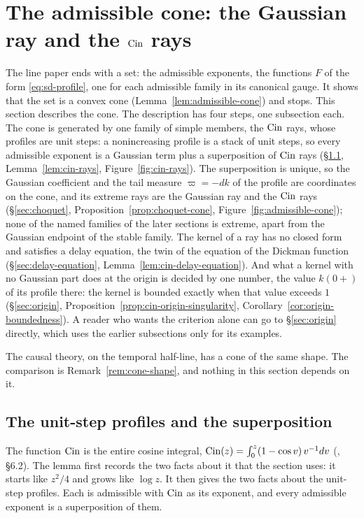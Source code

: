 \section{The admissible cone: the Gaussian ray and the \texorpdfstring{$\operatorname{Cin}$}{Cin} rays}
\label{sec:cone}

The line paper ends with a set: the admissible exponents, the functions $F$ of the form
\ref{eq:sd-profile}, one for each admissible family in its canonical gauge. It shows that
the set is a convex cone (Lemma~\ref{lem:admissible-cone}) and stops. This section describes
the cone. The description has four steps, one subsection each. The cone is generated by one family of
simple members, the $\operatorname{Cin}$ rays, whose profiles are unit steps: a nonincreasing profile is a
stack of unit steps, so every admissible exponent is a Gaussian term plus a superposition of
$\operatorname{Cin}$ rays (\S\ref{sec:cin-rays}, Lemma~\ref{lem:cin-rays}, Figure~\ref{fig:cin-rays}). The
superposition is unique, so the Gaussian coefficient and the tail measure $\varpi = -dk$ of
the profile are coordinates on the cone, and its extreme rays are the Gaussian ray and the
$\operatorname{Cin}$ rays (\S\ref{sec:choquet}, Proposition~\ref{prop:choquet-cone},
Figure~\ref{fig:admissible-cone}); none of the named families of the later sections is
extreme, apart from the Gaussian endpoint of the stable family. The kernel of a ray has no
closed form and satisfies a delay equation, the twin of the equation of the Dickman function
(\S\ref{sec:delay-equation}, Lemma~\ref{lem:cin-delay-equation}). And what a kernel with
no Gaussian part does at the origin is decided by one number, the value $k(0{+})$ of its
profile there: the kernel is bounded exactly when that value exceeds $1$
(\S\ref{sec:origin}, Proposition~\ref{prop:cin-origin-singularity},
Corollary~\ref{cor:origin-boundedness}). A reader who wants the criterion alone can go to
\S\ref{sec:origin} directly, which uses the earlier subsections only for its examples.

The causal theory, on the temporal half-line, has a cone of the same shape. The comparison is
Remark~\ref{rem:cone-shape}, and nothing in this section depends on it.

\subsection{The unit-step profiles and the superposition}\label{sec:cin-rays}

The function $\operatorname{Cin}$ is the entire cosine integral,
$\operatorname{Cin}(z) = \int_0^z (1 - \cos v)\,v^{-1}dv$ (, \S6.2). The lemma first
records the two facts about it that the section uses: it starts like $z^2/4$ and grows like
$\log z$. It then gives the two facts about the unit-step profiles. Each is admissible with
$\operatorname{Cin}$ as its exponent, and every admissible exponent is a superposition of them.

